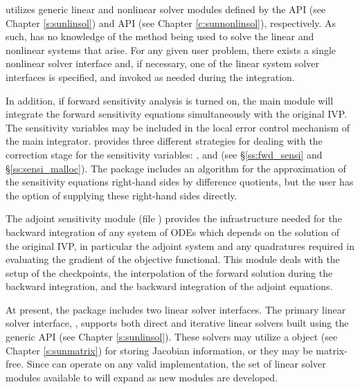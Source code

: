 {\cvodes} utilizes generic linear and nonlinear solver modules defined by the
{\sunlinsol} API (see Chapter \ref{s:sunlinsol}) and {\sunnonlinsol} API (see
Chapter \ref{c:sunnonlinsol}), respectively. As such, {\cvodes} has no knowledge
of the method being used to solve the linear and nonlinear systems that
arise. For any given user problem, there exists a single nonlinear solver
interface and, if necessary, one of the linear system solver interfaces is
specified, and invoked as needed during the integration.

In addition, if forward sensitivity analysis is turned on, the main module
will integrate the forward sensitivity equations simultaneously with the original
IVP. The sensitivity variables may be included in the local error control
mechanism of the main integrator.
{\cvodes} provides three different strategies for dealing with the correction
stage for the sensitivity variables: ,  and
 (see \S\ref{ss:fwd_sensi} and \S\ref{ss:sensi_malloc}).
The {\cvodes} package includes an algorithm for the approximation of the
sensitivity equations right-hand sides by difference quotients, but the user has
the option of supplying these right-hand sides directly.

The adjoint sensitivity module (file ) provides the infrastructure needed for the
backward integration of any system of ODEs which depends on the solution
of the original IVP, in particular the adjoint system and any quadratures required
in evaluating the gradient of the objective functional.  This module deals with
the setup of the checkpoints, the interpolation of the forward solution during
the backward integration, and the backward integration of the adjoint equations.

At present, the package includes two linear solver interfaces.  The
primary linear solver interface, {\cvls}, supports both direct and
iterative linear solvers built using the generic {\sunlinsol} API (see
Chapter \ref{s:sunlinsol}).  These solvers may utilize a {\sunmatrix}
object (see Chapter \ref{s:sunmatrix}) for storing Jacobian
information, or they may be matrix-free. Since {\cvodes} can operate on
any valid {\sunlinsol} implementation, the set of linear solver
modules available to {\cvodes} will expand as new {\sunlinsol} modules
are developed.

